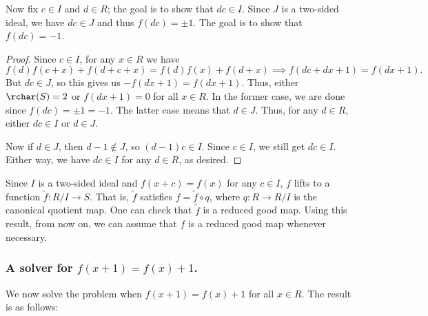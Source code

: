 Now fix $c \in I$ and $d \in R$; the goal is to show that $dc \in I$.
Since $J$ is a two-sided ideal, we have $dc \in J$ and thus $f(dc) = \pm 1$.
The goal is to show that $f(dc) = -1$.

\begin{proof}
Since $c \in I$, for any $x \in R$ we have
\[ f(d) f(c + x) + f(d + c + x) = f(d) f(x) + f(d + x) \implies f(dc + dx + 1) = f(dx + 1). \]
But $dc \in J$, so this gives us $-f(dx + 1) = f(dx + 1)$.
Thus, either $\rchar(S) = 2$ or $f(dx + 1) = 0$ for all $x \in R$.
In the former case, we are done since $f(dc) = \pm 1 = -1$.
The latter case means that $d \in J$.
Thus, for any $d \in R$, either $dc \in I$ or $d \in J$.

Now if $d \in J$, then $d - 1 \notin J$, so $(d - 1)c \in I$.
Since $c \in I$, we still get $dc \in I$.
Either way, we have $dc \in I$ for any $d \in R$, as desired.
\end{proof}

Since $I$ is a two-sided ideal and $f(x + c) = f(x)$ for any $c \in I$, $f$ lifts to a function $\tilde{f} : R/I \to S$.
That is, $\tilde{f}$ satisfies $f = \tilde{f} \circ q$, where $q : R \to R/I$ is the canonical quotient map.
One can check that $\tilde{f}$ is a reduced good map.
Using this result, from now on, we can assume that $f$ is a reduced good map whenever necessary.




\subsubsection*{A solver for $f(x + 1) = f(x) + 1$.}

We now solve the problem when $f(x + 1) = f(x) + 1$ for all $x \in R$.
The result is as follows:


